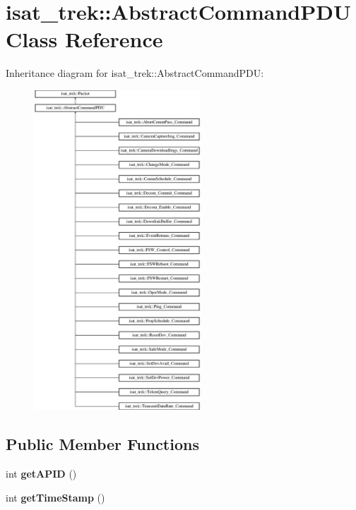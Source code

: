 \hypertarget{classisat__trek_1_1_abstract_command_p_d_u}{}\section{isat\+\_\+trek\+:\+:Abstract\+Command\+P\+DU Class Reference}
\label{classisat__trek_1_1_abstract_command_p_d_u}
Inheritance diagram for isat\+\_\+trek\+:\+:Abstract\+Command\+P\+DU\+:\begin{figure}[H]
\begin{center}
\leavevmode
\includegraphics[height=12.000000cm]{classisat__trek_1_1_abstract_command_p_d_u}
\end{center}
\end{figure}
\subsection*{Public Member Functions}
\begin{DoxyCompactItemize}
\item 
int {\bfseries get\+A\+P\+ID} ()\hypertarget{classisat__trek_1_1_abstract_command_p_d_u_a48038919f3ee604341b6c855232afda4}{}\label{classisat__trek_1_1_abstract_command_p_d_u_a48038919f3ee604341b6c855232afda4}

\item 
int {\bfseries get\+Time\+Stamp} ()\hypertarget{classisat__trek_1_1_abstract_command_p_d_u_ad729263ce479b98139fc8015203ae862}{}\label{classisat__trek_1_1_abstract_command_p_d_u_ad729263ce479b98139fc8015203ae862}

\end{DoxyCompactItemize}
